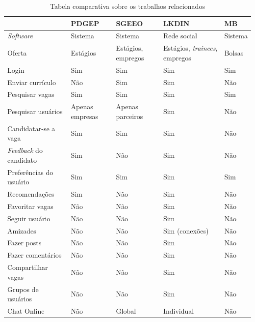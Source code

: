 \begin{table}[h]
    \begin{adjustwidth}{-0.7in}{-0.7in}
    \begin{center}
    \caption{Tabela comparativa sobre os trabalhos relacionados}
    \begin{tabular}{lllll}
    \hline
                        & PDGEP           & SGEEO             & LKDIN         & MB \\
    \hline
    \textit{Software}   & Sistema         & Sistema           & Rede social   & Sistema \\
    Oferta              & Estágios        & Estágios, empregos &Estágios, \textit{trainees}, empregos & Bolsas \\
    Login               & Sim             & Sim               & Sim           & Sim \\
    Enviar currículo    & Não             & Sim               & Sim           & Não \\
    Pesquisar vagas     & Sim             & Sim               & Sim           & Sim \\
    Pesquisar usuários  & Apenas empresas & Apenas parceiros  & Sim           & Não \\
    Candidatar-se a vaga& Sim             & Sim               & Sim           & Não \\
    \textit{Feedback} do candidato & Sim  & Não               & Sim           & Não \\
    Preferências do usuário & Sim         & Sim               & Sim           & Sim \\
    Recomendações       & Sim             & Não               & Sim           & Não \\
    Favoritar vagas     & Não             & Não               & Sim           & Não \\
    Seguir usuário      & Não             & Não               & Sim           & Não \\
    Amizades            & Não             & Não               & Sim (conexões) & Não \\
    Fazer posts         & Não             & Não               & Sim           & Não \\
    Fazer comentários   & Não             & Não               & Sim           & Não \\
    Compartilhar vagas  & Não             & Não               & Sim           & Não \\
    Grupos de usuários  & Não             & Não               & Sim           & Não \\
    Chat Online         & Não             & Global            & Individual    & Não \\
    \hline
    
    \end{tabular}
    \end{center}
    \end{adjustwidth}
    \bigskip
    \label{tabelaAvalTrab}
\end{table}